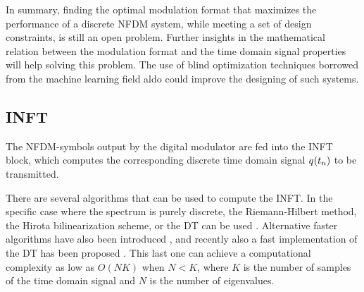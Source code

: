 In summary, finding the optimal modulation format that maximizes the performance  of a discrete \ac{NFDM} system, while meeting a set of design constraints,  is still an open problem. Further insights in the mathematical relation between the modulation format and the time domain signal properties will help solving this problem. The use of blind optimization techniques borrowed from the machine learning field aldo could improve the designing of such systems.

\subsection{INFT}\label{sec:nfdm_inft}

The \ac{NFDM}-symbols output by the digital modulator are fed into the \ac{INFT} block, which computes the corresponding discrete time domain signal $q_{} (t_n)$ to be transmitted.

There are several algorithms that can be used to compute the \ac{INFT}. In the specific case where the spectrum is purely discrete, the Riemann-Hilbert method, the Hirota bilinearization scheme, or the \ac{DT} can be used \cite{Yousefi2014a}.
Alternative faster algorithms have also been introduced \cite{wahls2015fast}, and recently also a fast implementation of the \ac{DT} has been proposed \cite{vaibhav2017introducing}. This last one can achieve a computational complexity as low as $O(N K )$ when $N < K$, where $K$ is the number of samples of the time domain signal and $N$ is the number of eigenvalues.

